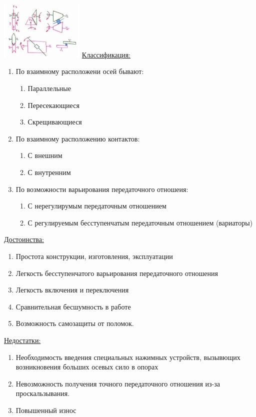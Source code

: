 \documentclass{article}
\begin{document}
\begin{multicols}{3}
\includegraphics[width = 0.3\textwidth]{18_1}
\underline{Классификация:} 
\begin{enumerate}
	\item По взаимному расположени осей бывают:
	\begin{enumerate}
		\item Параллельные
		\item Пересекающиеся
		\item Скрещивающиеся
	\end{enumerate}
	\item По взаимному расположению контактов:
	\begin{enumerate}
		\item С внешним
		\item С внутренним
	\end{enumerate}
	\item По возможности варьирования передаточного отношеия:
	\begin{enumerate}
		\item С нерегулирумым передаточным отношением
		\item С регулируемым бесступенчатым передаточным отношением (вариаторы)
	\end{enumerate}
\end{enumerate}

\underline{Достоинства:} 
\begin{enumerate}
	\item Простота конструкции, изготовления, эксплуатации
	\item Легкость бесступенчатого варьирования передаточного отношения
	\item Легкость включения и переключения
	\item Сравнительная бесшумность в работе
	\item Возможность самозащиты от поломок.
\end{enumerate}

\underline{Недостатки:}
\begin{enumerate}
	\item Необходимость введения специальных нажимных устройств, вызывющих возникновения больших осевых сило в опорах
	\item Невозможность получения точного передаточного отношения из-за проскальзывания.
	\item Повышенный износ
\end{enumerate}


\end{multicols}
\end{document}
